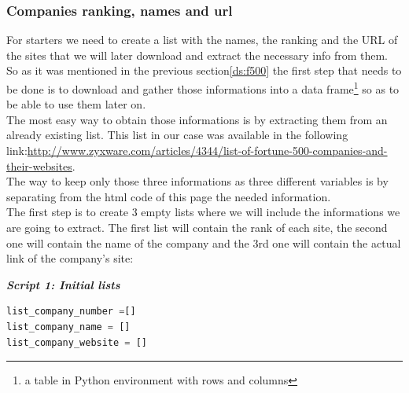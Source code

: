 \documentclass{article}
\begin{document}
\subsubsection{Companies ranking, names and url}
For starters we need to create a list with the names, the ranking and the URL of the sites that we will later download and extract the necessary info from them. So as it was mentioned in the previous section\ref{ds:f500} the first step that needs to be done is to download and gather those informations into a data frame\footnote{a table in Python environment with rows and columns} so as to be able to use them later on.\\
The most easy way to obtain those informations is by extracting them from an already existing list. This list in our case was available in the following link:\href{url}{http://www.zyxware.com/articles/4344/list-of-fortune-500-companies-and-their-websites}.\\
The way to keep only those three informations as three different variables is by separating from the html code of this page the needed information.\\
The first step is to create 3 empty lists where we will include the informations we are going to extract. The first list will contain the rank of each site, the second one will contain the name of the company and the 3rd one will contain the actual link of the company's site:

\begin{center}
\textit{\textbf{Script 1: Initial lists}}
\end{center}
\begin{lstlisting}[language=Python]
list_company_number =[]
list_company_name = []
list_company_website = []
\end{lstlisting}
\end{document}
